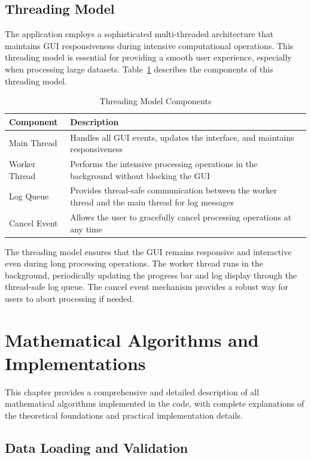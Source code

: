 \documentclass[11pt,a4paper]{article}
\begin{document}
\subsection{Threading Model}

The application employs a sophisticated multi-threaded architecture that maintains GUI responsiveness during intensive computational operations. This threading model is essential for providing a smooth user experience, especially when processing large datasets. Table~\ref{tab:threading} describes the components of this threading model.

\begin{table}[h]
\centering
\caption{Threading Model Components}\label{tab:threading}
\begin{tabular}{p{4cm}p{10cm}}
\toprule
\textbf{Component} & \textbf{Description} \\
\midrule
Main Thread & Handles all GUI events, updates the interface, and maintains responsiveness \\
Worker Thread & Performs the intensive processing operations in the background without blocking the GUI \\
Log Queue & Provides thread-safe communication between the worker thread and the main thread for log messages \\
Cancel Event & Allows the user to gracefully cancel processing operations at any time \\
\bottomrule
\end{tabular}
\end{table}

The threading model ensures that the GUI remains responsive and interactive even during long processing operations. The worker thread runs in the background, periodically updating the progress bar and log display through the thread-safe log queue. The cancel event mechanism provides a robust way for users to abort processing if needed.

\section{Mathematical Algorithms and Implementations}

This chapter provides a comprehensive and detailed description of all mathematical algorithms implemented in the code, with complete explanations of the theoretical foundations and practical implementation details.

\subsection{Data Loading and Validation}
\end{document}
